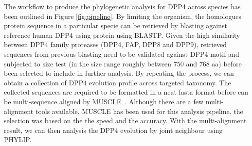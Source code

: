 The workflow to produce the phylogenetic analysis for DPP4 across species has been outlined in Figure \ref{fig:pipeline}. By limiting the organism, the homologues protein sequence in a particular specie can be retrieved by blasting against reference human DPP4 using protein using BLASTP. Given the high similarity between DPP4 family proteases (DPP4, FAP, DPP8 and DPP9), retrieved sequences from previous blasting need to be validated against DPP4 motif and subjected to size test (in the size range roughly between 750 and 768 aa) before been selected to include in further analysis. By repeating the process, we can obtain a collection of DPP4 evolution profile across targeted taxonomy. The collected sequences are required to be formatted in a neat fasta format before can be multi-sequence aligned by MUSCLE~\cite{15318951}. Although there are a few multi-alignment tools available, MUSCLE has been used for this analysis pipeline, the selection was based on the the speed and the accuracy. With the multi-alignment result, we can then analysis the DPP4 evolution by joint neighbour using PHYLIP. \\

